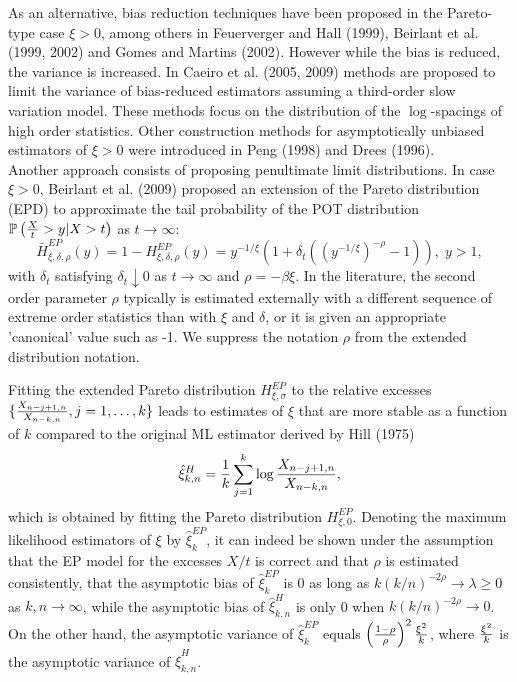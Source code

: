 \documentclass[twoside,leqno,11pt]{article}
\begin{document}
As an alternative, bias reduction techniques  have been proposed in the Pareto-type case $\xi >0$, among others in Feuerverger and Hall (1999),  Beirlant et al. (1999, 2002) and Gomes and Martins (2002). However while the bias is reduced, the variance is increased. In Caeiro et al. (2005, 2009) methods are proposed to limit the variance of bias-reduced estimators  assuming a third-order slow variation model. These methods focus on the distribution of the $\log$-spacings of high order statistics.  Other  construction methods for asymptotically unbiased estimators of $\xi >0$ were introduced in Peng (1998) and Drees (1996).\\
Another approach consists of proposing penultimate limit distributions. In case $\xi >0$, 
Beirlant et al. (2009) proposed an extension of the Pareto distribution (EPD) to approximate the tail probability of the  POT distribution $\mathbb{P}\left( {X \over t}>y|X>t \right)$  as $t \to \infty$:
\begin{equation}
\bar{H}_{\xi,\delta,\rho}^{EP}(y) = 1-H_{\xi,\delta,\rho}^{EP}(y)= y^{-1/\xi}\left( 1+ \delta_t \left( (y^{-1/\xi})^{-\rho}-1\right)\right), \; y>1,
\label{EP}
\end{equation}
with  $\delta_t$ satisfying $\delta_t \downarrow 0$ as $t \to \infty$ and $\rho=-\beta \xi$. In the literature, the second order parameter $\rho$ typically is estimated externally with a different sequence of extreme order statistics than with $\xi$ and $\delta$, or it is given an appropriate 'canonical' value such as -1. We suppress the notation $\rho$ from the extended distribution notation.

Fitting the extended Pareto distribution $H^{EP}_{\xi,\sigma}$ to the relative excesses 
 $\{ {X_{n-j+1,n}\over X_{n-k,n}}, j=1,\ldots,k\}$ leads to estimates of $\xi$ that are more stable as a function of $k$ compared to the original ML estimator derived by Hill (1975)
$$
\hat{\xi}^H_{k,n}= {1 \over k} \sum_{j=1}^k \log {X_{n-j+1,n}\over X_{n-k,n}},
$$
 which is obtained by fitting the Pareto distribution $H^{EP}_{\xi,0}$. Denoting the maximum likelihood estimators of $\xi$ by $\hat{\xi}_k^{EP}$, it can indeed be shown   under the assumption that the EP model for the excesses $X/t$ is correct and that $\rho$ is estimated consistently, that the asymptotic bias of $\hat{\xi}_k^{EP}$ is 0 as long as  $k (k/n)^{-2\rho} \to \lambda \geq 0$ as $k,n \to \infty$, while the asymptotic bias of $\hat{\xi}^H_{k,n}$ is only 0 when $k (k/n)^{-2\rho} \to 0$. On the other hand,  the asymptotic variance of $\hat{\xi}_k^{EP}$ equals $\left({1-\rho\over \rho}\right)^2 {\xi^2 \over k}$, where ${\xi^2 \over k}$ is the asymptotic variance of $\hat{\xi}^H_{k,n}$. 
\\
\end{document}
